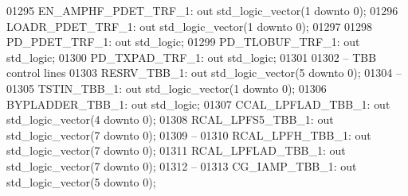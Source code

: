 \begin{DoxyCode}
01295         EN\_AMPHF\_PDET\_TRF\_1:    \textcolor{keywordflow}{out} \textcolor{comment}{std\_logic\_vector}(\textcolor{vhdllogic}{}\textcolor{vhdllogic}{1} \textcolor{keywordflow}{downto} \textcolor{vhdllogic}{}\textcolor{vhdllogic}{0});
01296         LOADR\_PDET\_TRF\_1:   \textcolor{keywordflow}{out} \textcolor{comment}{std\_logic\_vector}(\textcolor{vhdllogic}{}\textcolor{vhdllogic}{1} \textcolor{keywordflow}{downto} \textcolor{vhdllogic}{}\textcolor{vhdllogic}{0});
01297 
01298         PD\_PDET\_TRF\_1:      \textcolor{keywordflow}{out} \textcolor{comment}{std\_logic};
01299         PD\_TLOBUF\_TRF\_1:    \textcolor{keywordflow}{out} \textcolor{comment}{std\_logic};
01300         PD\_TXPAD\_TRF\_1:     \textcolor{keywordflow}{out} \textcolor{comment}{std\_logic};
01301 
01302 \textcolor{keyword}{        -- TBB control lines}
01303         RESRV\_TBB\_1:        \textcolor{keywordflow}{out} \textcolor{comment}{std\_logic\_vector}(\textcolor{vhdllogic}{}\textcolor{vhdllogic}{5} \textcolor{keywordflow}{downto} \textcolor{vhdllogic}{}\textcolor{vhdllogic}{0});
01304 \textcolor{keyword}{        --}
01305         TSTIN\_TBB\_1:        \textcolor{keywordflow}{out} \textcolor{comment}{std\_logic\_vector}(\textcolor{vhdllogic}{}\textcolor{vhdllogic}{1} \textcolor{keywordflow}{downto} \textcolor{vhdllogic}{}\textcolor{vhdllogic}{0});
01306         BYPLADDER\_TBB\_1:    \textcolor{keywordflow}{out} \textcolor{comment}{std\_logic};
01307         CCAL\_LPFLAD\_TBB\_1:  \textcolor{keywordflow}{out} \textcolor{comment}{std\_logic\_vector}(\textcolor{vhdllogic}{}\textcolor{vhdllogic}{4} \textcolor{keywordflow}{downto} \textcolor{vhdllogic}{}\textcolor{vhdllogic}{0});
01308         RCAL\_LPFS5\_TBB\_1:   \textcolor{keywordflow}{out} \textcolor{comment}{std\_logic\_vector}(\textcolor{vhdllogic}{}\textcolor{vhdllogic}{7} \textcolor{keywordflow}{downto} \textcolor{vhdllogic}{}\textcolor{vhdllogic}{0});
01309 \textcolor{keyword}{        --}
01310         RCAL\_LPFH\_TBB\_1:    \textcolor{keywordflow}{out} \textcolor{comment}{std\_logic\_vector}(\textcolor{vhdllogic}{}\textcolor{vhdllogic}{7} \textcolor{keywordflow}{downto} \textcolor{vhdllogic}{}\textcolor{vhdllogic}{0});
01311         RCAL\_LPFLAD\_TBB\_1:  \textcolor{keywordflow}{out} \textcolor{comment}{std\_logic\_vector}(\textcolor{vhdllogic}{}\textcolor{vhdllogic}{7} \textcolor{keywordflow}{downto} \textcolor{vhdllogic}{}\textcolor{vhdllogic}{0});
01312 \textcolor{keyword}{        --}
01313         CG\_IAMP\_TBB\_1:      \textcolor{keywordflow}{out} \textcolor{comment}{std\_logic\_vector}(\textcolor{vhdllogic}{}\textcolor{vhdllogic}{5} \textcolor{keywordflow}{downto} \textcolor{vhdllogic}{}\textcolor{vhdllogic}{0});

\end{DoxyCode}
